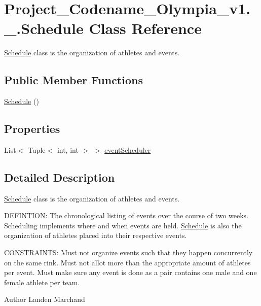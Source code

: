 \hypertarget{classProject__Codename__Olympia__v1_1_1__0_1_1Schedule}{}\section{Project\+\_\+\+Codename\+\_\+\+Olympia\+\_\+v1.\+\_.\+Schedule Class Reference}
\label{classProject__Codename__Olympia__v1_1_1__0_1_1Schedule}


\hyperlink{classProject__Codename__Olympia__v1_1_1__0_1_1Schedule}{Schedule} class is the organization of athletes and events.  


\subsection*{Public Member Functions}
\begin{DoxyCompactItemize}
\item 
\hyperlink{classProject__Codename__Olympia__v1_1_1__0_1_1Schedule_af4fe4aaff507c77bfc5294025b8342c2}{Schedule} ()
\end{DoxyCompactItemize}
\subsection*{Properties}
\begin{DoxyCompactItemize}
\item 
List$<$ Tuple$<$ int, int $>$ $>$ \hyperlink{classProject__Codename__Olympia__v1_1_1__0_1_1Schedule_a1aabf7243a96c19b51b2cb482b6ef421}{event\+Scheduler}
\end{DoxyCompactItemize}


\subsection{Detailed Description}
\hyperlink{classProject__Codename__Olympia__v1_1_1__0_1_1Schedule}{Schedule} class is the organization of athletes and events. 

D\+E\+F\+I\+N\+T\+I\+ON\+: The chronological listing of events over the course of two weeks. Scheduling implements where and when events are held. \hyperlink{classProject__Codename__Olympia__v1_1_1__0_1_1Schedule}{Schedule} is also the organization of athletes placed into their respective events.

C\+O\+N\+S\+T\+R\+A\+I\+N\+TS\+: Must not organize events such that they happen concurrently on the same rink. Must not allot more than the appropriate amount of athletes per event. Must make sure any event is done as a pair contains one male and one female athlete per team.\begin{DoxyAuthor}{Author}
Landen Marchand 
\end{DoxyAuthor}


